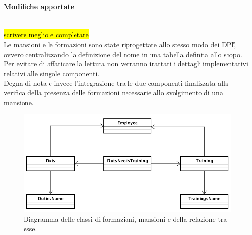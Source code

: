 \paragraph*{Modifiche apportate} \mbox{} \\
\hl{scrivere meglio e completare}\\

Le mansioni e le formazioni sono state riprogettate allo stesso modo dei \gls{DPI}\G, ovvero centralizzando la definizione del nome in una tabella definita allo scopo. \\
Per evitare di affaticare la lettura non verranno trattati i dettagli implementativi relativi alle singole componenti. \\
Degna di nota è invece l'integrazione tra le due componenti finalizzata alla verifica della presenza delle formazioni necessarie allo svolgimento di una mansione. \\

\begin{figure}[H]
	\begin{center}
		\includegraphics[width=12cm]{Pics/UMLClassiFormazioniMansioni.png}
		\caption{Diagramma delle classi di formazioni, mansioni e della relazione tra esse.}
		\label{fig:UMLClassiFormazioniMansioni.png}
	\end{center}
\end{figure}

